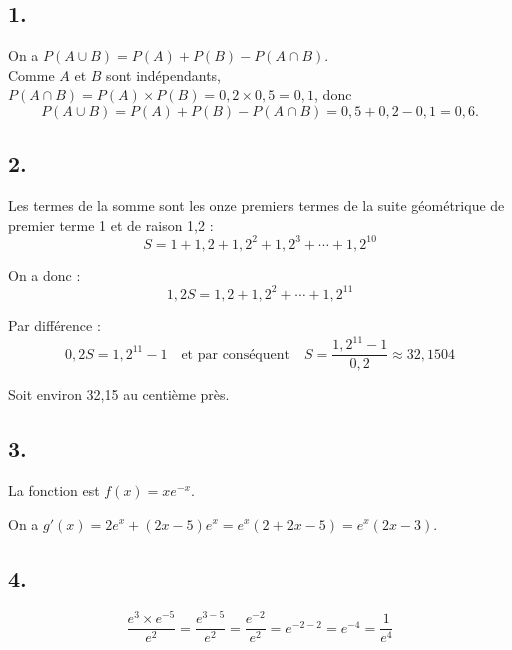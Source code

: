 \subsection*{1.}
	
	On a \(P(A \cup B) = P(A) + P(B) - P(A \cap B)\). \\
	Comme \(A\) et \(B\) sont indépendants, \(P(A \cap B) = P(A) \times P(B) = 0,2 \times 0,5 = 0,1\), donc
	\[
	P(A \cup B) = P(A) + P(B) - P(A \cap B) = 0,5 + 0,2 - 0,1 = 0,6.
	\]
	
	\subsection*{2.}
	
	Les termes de la somme sont les onze premiers termes de la suite géométrique de premier terme 1 et de raison 1,2 :
	\[
	S = 1 + 1,2 + 1,2^2 + 1,2^3 + \cdots + 1,2^{10}
	\]
	
	On a donc :
	\[
	1,2S = 1,2 + 1,2^2 + \cdots + 1,2^{11}
	\]
	
	Par différence :
	\[
	0,2S = 1,2^{11} - 1 \quad \text{et par conséquent} \quad S = \dfrac{1,2^{11} - 1}{0,2} \approx 32,1504
	\]
	
	Soit environ 32,15 au centième près.
	
	\subsection*{3.}
	
	La fonction est \(f(x) = xe^{-x}\).
	
	On a \(g'(x) = 2e^x + (2x - 5)e^x = e^x(2 + 2x - 5) = e^x(2x - 3)\).
	
	\subsection*{4.}
	
	\[
	\dfrac{e^3 \times e^{-5}}{e^2} = \dfrac{e^{3-5}}{e^2} = \dfrac{e^{-2}}{e^2} = e^{-2-2} = e^{-4} = \dfrac{1}{e^4}
	\]
